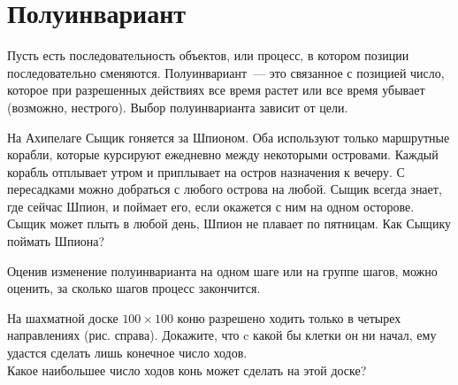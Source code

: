 
\section*{Полуинвариант}



Пусть есть последовательность объектов, или процесс, в котором позиции
последовательно сменяются.
Полуинвариант~--- это связанное с позицией число, которое при разрешенных
действиях все время растет или все время убывает (возможно, нестрого).
Выбор полуинварианта зависит от цели.

\begin{problems}

\item
На Ахипелаге Сыщик гоняется за Шпионом.
Оба используют только маршрутные корабли, которые курсируют ежедневно между
некоторыми островами.
Каждый корабль отплывает утром и приплывает на остров назначения к вечеру.
С пересадками можно добраться с любого острова на любой.
Сыщик всегда знает, где сейчас Шпион, и поймает его, если окажется с ним
на одном осторове.
Сыщик может плыть в любой день, Шпион не плавает по пятницам.
Как Сыщику поймать Шпиона?

\end{problems}

Оценив изменение полуинварианта на одном шаге или на группе шагов, можно
оценить, за сколько шагов процесс закончится.

\begingroup
\ifx\problemfigurewidth\undefined
\newlength\problemfigurewidth
\newlength\problemtextwidth
\newlength\spacewidth
\fi
\setlength\problemfigurewidth{2.5cm}
\setlength\spacewidth{1em}
\setlength\problemtextwidth{\linewidth}
\addtolength\problemtextwidth{-\problemfigurewidth}
\addtolength\problemtextwidth{-\spacewidth}
\begin{minipage}{\problemtextwidth}
\begin{problems}

\item
\sp
На шахматной доске $100 \times 100$ коню разрешено ходить только в четырех
направлениях (рис. справа).
Докажите, что c какой бы клетки он ни начал, ему удастся сделать лишь конечное
число ходов.
\\
\sp
Какое наибольшее число ходов конь может сделать на этой доске?

\end{problems}
\end{minipage}\hspace{\spacewidth}%
\begin{minipage}{\problemfigurewidth}
\end{minipage}
\endgroup

